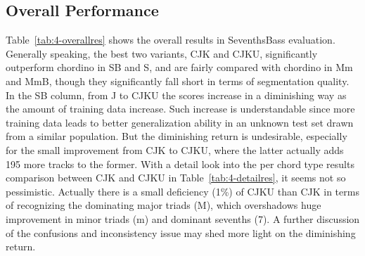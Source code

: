 \subsection{Overall Performance}
Table~\ref{tab:4-overallres} shows the overall  results in SeventhsBass evaluation. Generally speaking, the best two variants, CJK and CJKU, significantly outperform chordino in SB and S, and are fairly compared with chordino in Mm and MmB, though they significantly fall short in terms of segmentation quality. In the SB column, from J to CJKU the scores increase in a diminishing way as the amount of training data increase. Such increase is understandable since more training data leads to better generalization ability in an unknown test set drawn from a similar population. But the diminishing return is undesirable, especially for the small improvement from CJK to CJKU, where the latter actually adds 195 more tracks to the former. With a detail look into the per chord type results comparison between CJK and CJKU in Table~\ref{tab:4-detailres}, it seems not so pessimistic. Actually there is a small deficiency (1\%) of CJKU than CJK in terms of recognizing the dominating major triads (M), which overshadows huge improvement in minor triads (m) and dominant sevenths (7). A further discussion of the confusions and inconsistency issue may shed more light on the diminishing return.
